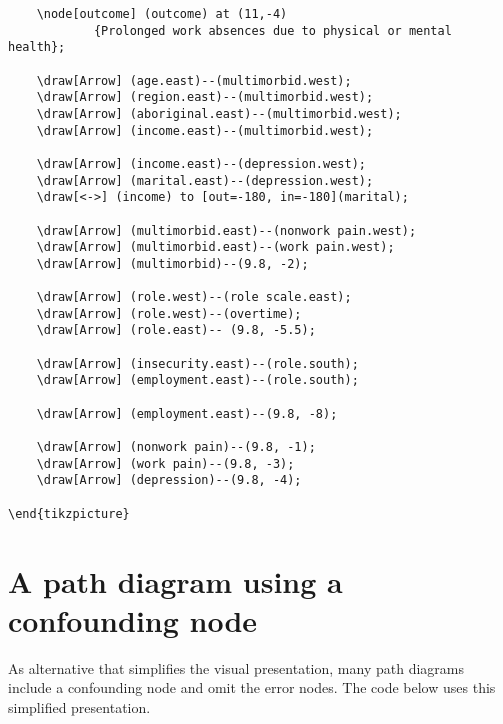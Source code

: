 \documentclass[a4paper]{report}
\begin{document}
\begin{framed}
\begin{Verbatim}
    \node[outcome] (outcome) at (11,-4) 
            {Prolonged work absences due to physical or mental health};
    
    \draw[Arrow] (age.east)--(multimorbid.west);
    \draw[Arrow] (region.east)--(multimorbid.west);
    \draw[Arrow] (aboriginal.east)--(multimorbid.west);
    \draw[Arrow] (income.east)--(multimorbid.west);
    
    \draw[Arrow] (income.east)--(depression.west);
    \draw[Arrow] (marital.east)--(depression.west);
    \draw[<->] (income) to [out=-180, in=-180](marital);
    
    \draw[Arrow] (multimorbid.east)--(nonwork pain.west);
    \draw[Arrow] (multimorbid.east)--(work pain.west);
    \draw[Arrow] (multimorbid)--(9.8, -2);
    
    \draw[Arrow] (role.west)--(role scale.east);
    \draw[Arrow] (role.west)--(overtime);
    \draw[Arrow] (role.east)-- (9.8, -5.5);
    
    \draw[Arrow] (insecurity.east)--(role.south);
    \draw[Arrow] (employment.east)--(role.south);
    
    \draw[Arrow] (employment.east)--(9.8, -8);
    
    \draw[Arrow] (nonwork pain)--(9.8, -1);
    \draw[Arrow] (work pain)--(9.8, -3);
    \draw[Arrow] (depression)--(9.8, -4);

\end{tikzpicture}

\end{Verbatim}
\end{framed}

\section{A path diagram using a confounding node}
As alternative that simplifies the visual presentation, many path diagrams include a confounding node and omit the error nodes. The code below uses this simplified presentation.

\vspace{3em}
\end{document}
